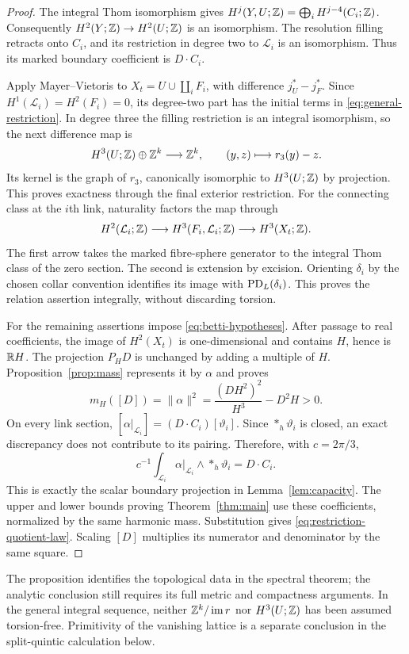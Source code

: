 \begin{proof}
The integral Thom isomorphism gives
$H^j(Y,U;\mathbb Z)=\bigoplus_iH^{j-4}(C_i;\mathbb Z)$.
Consequently $H^2(Y;\mathbb Z)\to H^2(U;\mathbb Z)$ is an isomorphism.
The resolution filling retracts onto $C_i$, and its restriction
in degree two to $\mathcal L_i$ is an isomorphism. Thus its marked
boundary coefficient is $D\cdot C_i$.

Apply Mayer--Vietoris to $X_t=U\cup\coprod_iF_i$, with difference
$j_U^*-j_F^*$. Since $H^1(\mathcal L_i)=H^2(F_i)=0$, its degree-two
part has the initial terms in \eqref{eq:general-restriction}.
In degree three the filling restriction is an integral isomorphism,
so the next difference map is
\[
 H^3(U;\mathbb Z)\oplus\mathbb Z^k\longrightarrow\mathbb Z^k,
 \qquad (y,z)\longmapsto r_3(y)-z.
\]
Its kernel is the graph of $r_3$, canonically isomorphic to $H^3(U;\mathbb Z)$
by projection. This proves exactness through the final exterior
restriction. For the connecting class at the $i$th link, naturality
factors the map through
\[
 H^2(\mathcal L_i;\mathbb Z)\longrightarrow
 H^3(F_i,\mathcal L_i;\mathbb Z)\longrightarrow H^3(X_t;\mathbb Z).
\]
The first arrow takes the marked fibre-sphere generator to the integral
Thom class of the zero section. The second is extension by excision.
Orienting $\delta_i$ by the chosen collar convention identifies its
image with $\operatorname{PD}_L(\delta_i)$. This proves the relation assertion
integrally, without discarding torsion.

For the remaining assertions impose \eqref{eq:betti-hypotheses}.
After passage to real coefficients, the image of $H^2(X_t)$ is
one-dimensional and contains $H$, hence is $\mathbb R H$. The projection
$P_HD$ is unchanged by adding a multiple of $H$. Proposition~\ref{prop:mass}
represents it by $\alpha$ and proves
\[
 m_H([D])=\|\alpha\|^2=\frac{(DH^2)^2}{H^3}-D^2H>0.
\]
On every link section,
$[\alpha|_{\mathcal L_i}]=(D\cdot C_i)[\vartheta_i]$.
Since $*_h\vartheta_i$ is closed, an exact discrepancy does not
contribute to its pairing. Therefore, with $c=2\pi/3$,
\begin{equation}\label{eq:period-capacity-identification}
 c^{-1}\int_{\mathcal L_i}\alpha|_{\mathcal L_i}
       \wedge *_h\vartheta_i=D\cdot C_i.
\end{equation}
This is exactly the scalar boundary projection in
Lemma~\ref{lem:capacity}. The upper and lower bounds proving
Theorem~\ref{thm:main} use these coefficients, normalized by the
same harmonic mass. Substitution gives
\eqref{eq:restriction-quotient-law}. Scaling $[D]$ multiplies its
numerator and denominator by the same square.
\end{proof}

The proposition identifies the topological data in the spectral theorem;
the analytic conclusion still requires its full metric and compactness
arguments. In the general integral sequence, neither
$\mathbb Z^k/\operatorname{im} r$ nor $H^3(U;\mathbb Z)$ has been assumed torsion-free.
Primitivity of the vanishing lattice is a separate conclusion in the
split-quintic calculation below.
